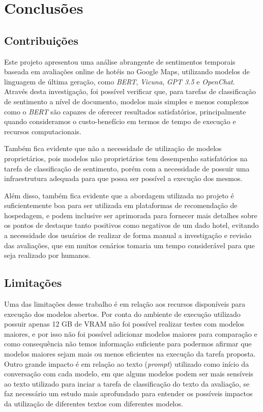 \chapter{Conclusões}
\label{cap:conclusao}

\section{Contribuições}
\label{cap:conclusao:sec:contribuicoes}

Este projeto apresentou uma análise abrangente de sentimentos temporais baseada em avaliações online de hotéis no Google Maps, utilizando modelos de linguagem de última geração, como \textit{BERT}, \textit{Vicuna}, \textit{GPT 3.5} e \textit{OpenChat}. Através desta investigação, foi possível verificar que, para tarefas de classificação de sentimento a nível de documento, modelos mais simples e menos complexos como o \textit{BERT} são capazes de oferecer resultados satisfatórios, principalmente quando consideramos o custo-benefício em termos de tempo de execução e recursos computacionais.

Também fica evidente que não a necessidade de utilização de modelos proprietários, pois modelos não proprietários tem desempenho satisfatórios na tarefa de classificação de sentimento, porém com a necessidade de possuir uma infraestrutura adequada para que possa ser possível a execução dos mesmos.

Além disso, também fica evidente que a abordagem utilizada no projeto é suficientemente boa para ser utilizada em plataformas de recomendação de hospedagem, e podem inclusive ser aprimorada para fornecer mais detalhes sobre os pontos de destaque tanto positivos como negativos de um dado hotel, evitando a necessidade dos usuários de realizar de forma manual a investigação e revisão das avaliações, que em muitos cenários tomaria um tempo considerável para que seja realizado por humanos.

\section{Limitações}
\label{cap:conclusao:sec:limitacoes}

Uma das limitações desse trabalho é em relação aos recursos disponíveis para execução dos modelos abertos. Por conta do ambiente de execução utilizado possuir apenas 12 GB de VRAM não foi possível realizar testes com modelos maiores, e por isso não foi possível adicionar modelos maiores para comparação e como consequência não temos informação suficiente para podermos afirmar que modelos maiores sejam mais ou menos eficientes na execução da tarefa proposta. Outro grande impacto é em relação ao texto (\textit{prompt}) utilizado como início da conversação com cada modelo, em que alguns modelos podem ser mais sensíveis ao texto utilizado para inciar a tarefa de classificação do texto da avaliação, se faz necessário um estudo mais aprofundado para entender os possíveis impactos da utilização de diferentes textos com diferentes modelos.


